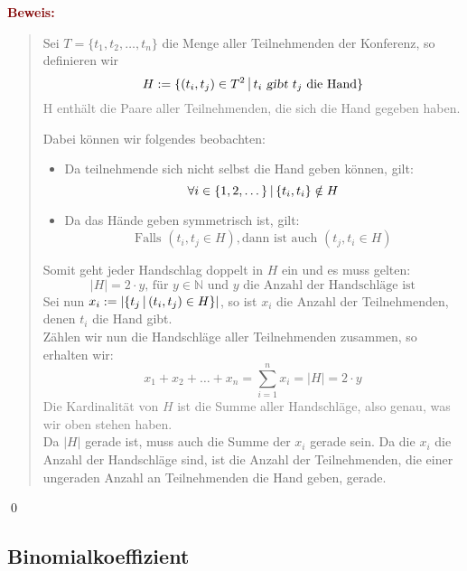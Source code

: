 \documentclass{article}
\newcommand{\smsp}{\phantom{\hspace{3px}}}
\newcommand{\gray}[1]{\textcolor{gray}{#1}}
\newcommand{\maroon}[1]{\textcolor{maroon}{#1}}
\newcommand{\pr}[1]{\maroon{\textbf{Beweis: }}\begin{quote}#1\end{quote}\qed}
\newcommand{\N}{\mathbb{N}}
\newcommand{\vst}{\smsp \vline \smsp}
\begin{document}
\pr{
    Sei $T = \{t_1, t_2, \dots, t_n\}$ die Menge aller Teilnehmenden der Konferenz, so definieren wir
    \begin{equation*}
        H := \{(t_i, t_j) \in T^2 \vst t_i \textsl{ gibt } t_j \text{ die Hand}\}
    \end{equation*}
    \gray{H enthält die Paare aller Teilnehmenden, die sich die Hand gegeben haben.}

    Dabei können wir folgendes beobachten:
    \begin{itemize}
        \item Da teilnehmende sich nicht selbst die Hand geben können, gilt:
        \begin{equation*}
            \forall i \in \{1, 2, \dots\} \vst \{t_i, t_i\} \notin H
        \end{equation*}
        \item Da das Hände geben symmetrisch ist, gilt:
        \begin{equation*}
            \text{Falls } (t_i, t_j \in H), \text{dann ist auch } (t_j, t_i \in H)
        \end{equation*}
    \end{itemize}
    Somit geht jeder Handschlag doppelt in $H$ ein und es muss gelten:
    \begin{equation*}
        |H| = 2 \cdot y \text{, für } y \in \N \text{ und $y$ die Anzahl der Handschläge ist}
    \end{equation*}
    Sei nun $x_i := |\{t_j \vst (t_i, t_j) \in H\}|$, so ist $x_i$ die Anzahl der Teilnehmenden, denen $t_i$ die Hand gibt.\\
    Zählen wir nun die Handschläge aller Teilnehmenden zusammen, so erhalten wir:
    \begin{equation*}
        x_1 + x_2 + \dots + x_n = \sum_{i = 1}^n x_i = |H| = 2 \cdot y
    \end{equation*}
    \gray{Die Kardinalität von $H$ ist die Summe aller Handschläge, also genau, was wir oben stehen haben.}\\
    Da $|H|$ gerade ist, muss auch die Summe der $x_i$ gerade sein. Da die $x_i$ die Anzahl der Handschläge sind, ist die Anzahl der Teilnehmenden, die einer ungeraden Anzahl an Teilnehmenden die Hand geben, gerade.
}

\newpage

\subsection{Binomialkoeffizient}
\end{document}
